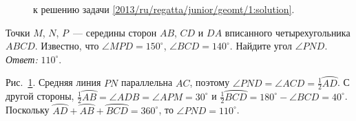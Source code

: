 \ifsolution
\begin{figure}\centering
    \caption{к решению задачи \ref{2013/ru/regatta/junior/geomt/1:solution}.}
    \label{2013/ru/regatta/junior/geomt/1:solution:fig}
\end{figure}%
\fi %

\problem
Точки $M$, $N$, $P$~--- середины сторон $AB$, $CD$ и $DA$ вписанного
четырехугольника $ABCD$.
Известно, что $\angle MPD = 150^\circ$, $\angle BCD = 140^\circ$.
Найдите угол $\angle PND$. 
\solution
\label{2013/ru/regatta/junior/geomt/1:solution}%
\ifx\wideparen\undefined\else\let\widearc\wideparen\fi
\ifx\overparen\undefined\else\let\widearc\overparen\fi
\emph{Ответ:} $110^\circ$.
\par
Рис.~\ref{2013/ru/regatta/junior/geomt/1:solution:fig}.
Средняя линия $PN$ параллельна $AC$, поэтому
$\angle PND = \angle ACD = \frac{1}{2} \widearc{AD}$.
С другой стороны,
$\frac{1}{2} \widearc{AB} = \angle ADB = \angle APM = 30^\circ$
и $\frac{1}{2} \widearc{BCD} = 180^\circ - \angle BCD = 40^\circ$.
Поскольку
$\widearc{AD} + \widearc{AB} + \widearc{BCD} = 360^\circ$,
то $\angle PND = 110^\circ$.
\endproblem
